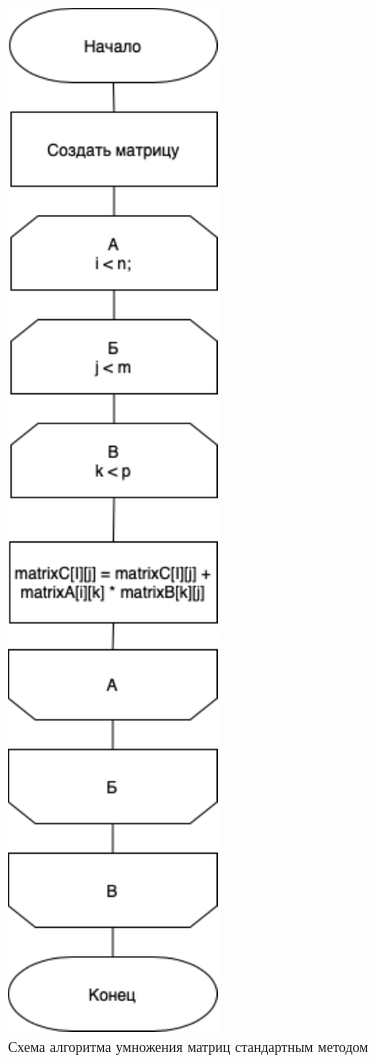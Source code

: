 \begin{figure}[h]
    \centering
    \includegraphics[width=0.3\linewidth]{img/standartAlg.pdf}
    \caption{Схема алгоритма умножения матриц стандартным методом}
    \label{fig:standartAlg}
\end{figure}

